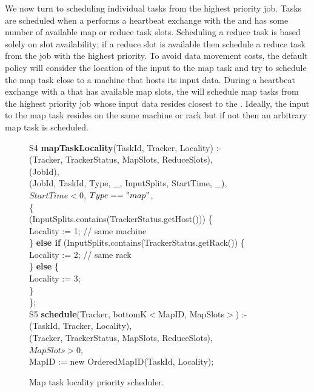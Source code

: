 We now turn to scheduling individual tasks from the highest priority job. Tasks are scheduled when
a \TT performs a heartbeat exchange with the \JT and has some number of available map or reduce 
task slots. Scheduling a reduce task is based solely on slot availability; if a reduce slot is available then
schedule a reduce task from the job with the highest priority. To avoid data movement costs, the default policy
will consider the location of the input to the map task and try to schedule the map task close to a machine 
that hosts its input data. During a heartbeat exchange with a \TT that has available map slots, the \JT will schedule 
map tasks from the highest priority job whose input data resides closest to the \TT. Ideally, the input to the map task resides 
on the same machine or rack but if not then an arbitrary map task is scheduled. 

\begin{figure}
\ssp
\centering
\begin{boxedminipage}{\linewidth}
S4 {\bf mapTaskLocality}(TaskId, Tracker, Locality) :- \\
(Tracker, TrackerStatus, MapSlots, ReduceSlots), \\
(JobId), \\
(JobId, TaskId, Type, \_, InputSplits, StartTime, \_), \\
\datalogspace $StartTime < 0$, $Type == "map"$, \\
\datalogspace \{ \\
\datalogspace {} (InputSplits.contains(TrackerStatus.getHost())) \{ \\
\datalogspace \datalogspace \datalogspace Locality := 1; // same machine \\
\datalogspace \datalogspace \} {\bf else if} (InputSplits.contains(TrackerStatus.getRack()) \{ \\
\datalogspace \datalogspace \datalogspace Locality := 2; // same rack \\
\datalogspace \datalogspace \} {\bf else} \{ \\
\datalogspace \datalogspace \datalogspace Locality := 3;  \\
\datalogspace \datalogspace \} \\
\datalogspace \}; \\
	
S5 {\bf schedule}(Tracker, bottomK$<$MapID, MapSlots$>$) :- \\
(TaskId, Tracker, Locality), \\
(Tracker, TrackerStatus, MapSlots, ReduceSlots), \\
\datalogspace $MapSlots > 0$, \\
\datalogspace MapID := new OrderedMapID(TaskId, Locality); \\

\end{boxedminipage}
\caption{\label{ch:boom:fig:schedule} Map task locality priority scheduler.}
\end{figure}

